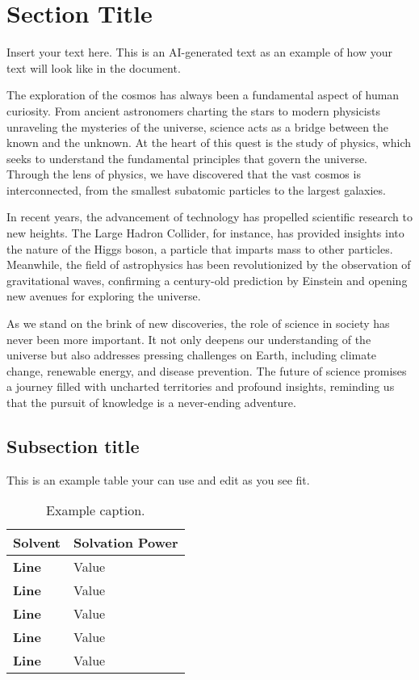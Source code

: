 \section{Section Title}

Insert your text here. This is an AI-generated text as an example of how your text will look like in the document.

The exploration of the cosmos has always been a fundamental aspect of human curiosity. From ancient astronomers charting the stars to modern physicists unraveling the mysteries of the universe, science acts as a bridge between the known and the unknown. At the heart of this quest is the study of physics, which seeks to understand the fundamental principles that govern the universe. Through the lens of physics, we have discovered that the vast cosmos is interconnected, from the smallest subatomic particles to the largest galaxies.

In recent years, the advancement of technology has propelled scientific research to new heights. The Large Hadron Collider, for instance, has provided insights into the nature of the Higgs boson, a particle that imparts mass to other particles. Meanwhile, the field of astrophysics has been revolutionized by the observation of gravitational waves, confirming a century-old prediction by Einstein and opening new avenues for exploring the universe.

As we stand on the brink of new discoveries, the role of science in society has never been more important. It not only deepens our understanding of the universe but also addresses pressing challenges on Earth, including climate change, renewable energy, and disease prevention. The future of science promises a journey filled with uncharted territories and profound insights, reminding us that the pursuit of knowledge is a never-ending adventure.

\subsection{Subsection title}

This is an example table your can use and edit as you see fit.

\begin{table}[!h]
	\centering
	\begin{threeparttable}
		\captionsetup{width=\textwidth}
		\caption{Example caption.}
		\label{exampletable}
		\begin{tabular}{P{2cm} P{4cm}}
			\hline
			\parbox{2cm}{\centering \textbf{Solvent}}
			& \parbox{4cm}{\centering \textbf{Solvation Power}}
			\\
			\hline
			\textbf{Line}& 	Value\\
			\textbf{Line}& 	Value\\
			\textbf{Line}& 	Value\\
			\textbf{Line}& 	Value\\
			\textbf{Line}& 	Value\\	
			\hline
		\end{tabular}
	\end{threeparttable}
\end{table}



